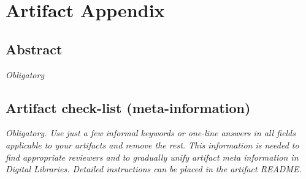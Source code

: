 \documentclass{sigplanconf}
\begin{document}


\appendix
\section{Artifact Appendix}

\subsection{Abstract}

{\em Obligatory}

\subsection{Artifact check-list (meta-information)}

{\em Obligatory. Use just a few informal keywords or one-line answers in all
fields applicable to your artifacts and remove the rest. This information is
needed to find appropriate reviewers and to gradually unify artifact meta
information in Digital Libraries. Detailed instructions can be placed in the
artifact README.}
\end{document}
